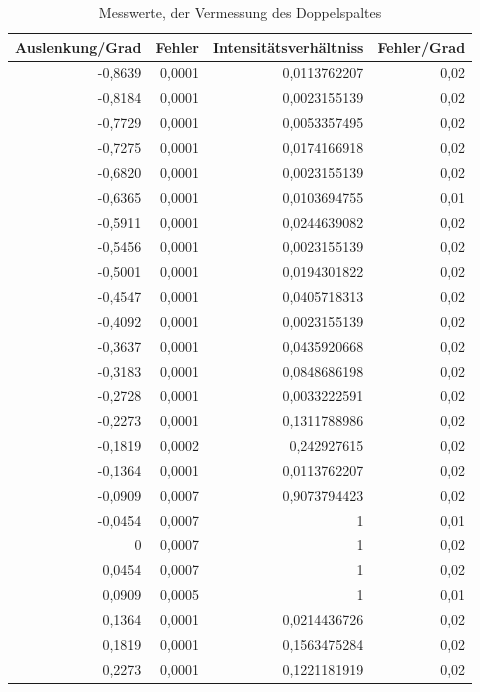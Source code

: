 \documentclass[12pt]{scrartcl}
\begin{document}
\begin{table}[H]
\caption{Messwerte, der Vermessung des Doppelspaltes}
\begin{center}
\begin{tabular}{|r|r|r|r|}
\hline
\multicolumn{1}{|l|}{Auslenkung/Grad} & \multicolumn{1}{l|}{Fehler} & \multicolumn{1}{l|}{Intensitätsverhältniss} & \multicolumn{1}{l|}{Fehler/Grad} \\ \hline
-0,8639 & 0,0001 & 0,0113762207 & 0,02 \\ \hline
-0,8184 & 0,0001 & 0,0023155139 & 0,02 \\ \hline
-0,7729 & 0,0001 & 0,0053357495 & 0,02 \\ \hline
-0,7275 & 0,0001 & 0,0174166918 & 0,02 \\ \hline
-0,6820 & 0,0001 & 0,0023155139 & 0,02 \\ \hline
-0,6365 & 0,0001 & 0,0103694755 & 0,01 \\ \hline
-0,5911 & 0,0001 & 0,0244639082 & 0,02 \\ \hline
-0,5456 & 0,0001 & 0,0023155139 & 0,02 \\ \hline
-0,5001 & 0,0001 & 0,0194301822 & 0,02 \\ \hline
-0,4547 & 0,0001 & 0,0405718313 & 0,02 \\ \hline
-0,4092 & 0,0001 & 0,0023155139 & 0,02 \\ \hline
-0,3637 & 0,0001 & 0,0435920668 & 0,02 \\ \hline
-0,3183 & 0,0001 & 0,0848686198 & 0,02 \\ \hline
-0,2728 & 0,0001 & 0,0033222591 & 0,02 \\ \hline
-0,2273 & 0,0001 & 0,1311788986 & 0,02 \\ \hline
-0,1819 & 0,0002 & 0,242927615 & 0,02 \\ \hline
-0,1364 & 0,0001 & 0,0113762207 & 0,02 \\ \hline
-0,0909 & 0,0007 & 0,9073794423 & 0,02 \\ \hline
-0,0454 & 0,0007 & 1 & 0,01 \\ \hline
0 & 0,0007 & 1 & 0,02 \\ \hline
0,0454 & 0,0007 & 1 & 0,02 \\ \hline
0,0909 & 0,0005 & 1 & 0,01 \\ \hline
0,1364 & 0,0001 & 0,0214436726 & 0,02 \\ \hline
0,1819 & 0,0001 & 0,1563475284 & 0,02 \\ \hline
0,2273 & 0,0001 & 0,1221181919 & 0,02 \\ \hline

\end{tabular}
\end{center}
\end{table}
\end{document}
